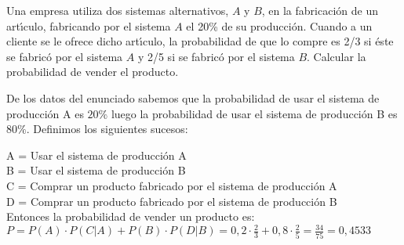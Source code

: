 \problem
Una empresa utiliza dos sistemas alternativos, $A$ y $B$, en  la  fabricaci{\'o}n
de un art{\'\i}culo, fabricando  por el sistema $A$    el  20\%  de  su  producci{\'o}n.
Cuando a un cliente se le ofrece dicho art{\'\i}culo, la probabilidad de que
lo compre es 2/3 si {\'e}ste se fabric{\'o} por el sistema $A$  y   2/5  si  se
fabric{\'o} por  el  sistema  $B$.  Calcular  la  probabilidad  de  vender  el
producto.

De los datos del enunciado sabemos que la probabilidad de usar el sistema de producción A es  $20\%$ luego la probabilidad de usar  el sistema de producción B es  $80\%$. Definimos los siguientes sucesos:

A = Usar el sistema de producción A  \\
B = Usar el sistema de producción B \\
C = Comprar un producto fabricado por el sistema de producción A \\
D = Comprar un producto fabricado por el sistema de producción B \\
		
		Entonces la probabilidad de vender un producto es:\\
	$P = P(A) \cdot P(C|A) + P(B) \cdot P(D|B) = 0,2 \cdot\frac{2}{3} + 0,8 \cdot\frac{2}{5} = \frac{34}{75} = 0,4533 $


